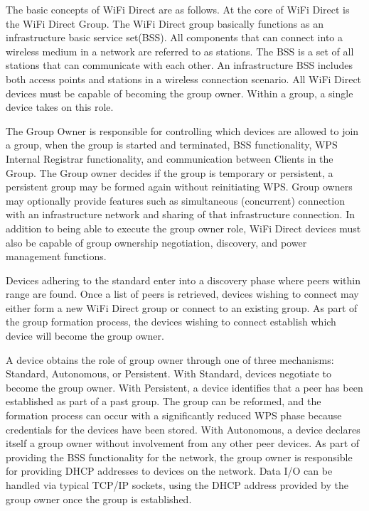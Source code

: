\documentclass[10pt,twocolumn]{article}
\begin{document}
The basic concepts of WiFi Direct are as follows. 
At the core of WiFi Direct is the WiFi Direct Group. 
The WiFi Direct group basically functions as an infrastructure basic service set(BSS). 
All components that can connect into a wireless medium in a network are referred to as stations. 
The BSS is a set of all stations that can communicate with each other. 
An infrastructure BSS includes both access points and stations in a wireless connection scenario.\cite{wirelesslanwiki}
All WiFi Direct devices must be capable of becoming the group owner. 
Within a group, a single device takes on this role.
 
The Group Owner is responsible for controlling which devices are allowed to join a group, when the group is started and terminated, BSS functionality, WPS Internal Registrar functionality, and communication between Clients in the Group. 
The Group owner decides if the group is temporary or persistent, a persistent group may be formed again without reinitiating WPS.
Group owners may optionally provide features such as simultaneous (concurrent) connection with an infrastructure network and sharing of that infrastructure connection. 
In addition to being able to execute the group owner role, WiFi Direct devices must also be capable of group ownership negotiation, discovery, and power management functions.
 
Devices adhering to the standard enter into a discovery phase where peers within range are found. 
Once a list of peers is retrieved, devices wishing to connect may either form a new  WiFi Direct group or connect to an existing group. 
As part of the group formation process, the devices wishing to connect establish which device will become the group owner.

A device obtains the role of group owner through one of three mechanisms: Standard, Autonomous, or Persistent. 
With Standard, devices negotiate to become the group owner.
With Persistent, a device identifies that a peer has been established as part of a past group. 
The group can be reformed, and the formation process can occur with a significantly reduced WPS phase because credentials for the devices have been stored.
With Autonomous, a device declares itself a group owner without involvement from any other peer devices. 
As part of providing the BSS functionality for the network, the group owner is responsible for providing DHCP addresses to devices on the network.
Data I/O can be handled via typical TCP/IP sockets, using the DHCP address provided by the group owner once the group is established\cite{wifiwhitepaper}.
\end{document}
